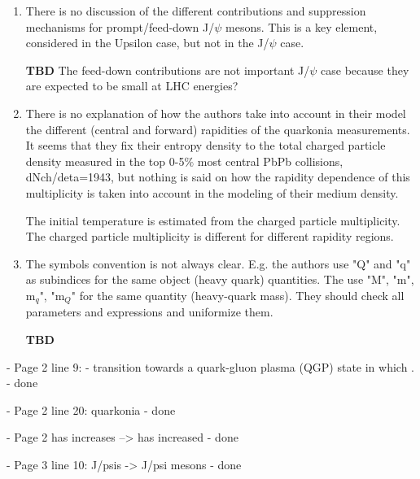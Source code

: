 \documentclass[a4paper,11pt]{article}
\begin{document}
\begin{enumerate}

\item There is no discussion of the different contributions and suppression 
mechanisms for prompt/feed-down J/$\psi$ mesons. This is a key element, considered 
in the Upsilon case, but not in the J/$\psi$ case.

{\color{red} \textbf{TBD} The feed-down contributions are not important J/$\psi$ case because they are
  expected to be small at LHC energies?} 




\item There is no explanation of how the authors take into account in their model 
the different (central and forward) rapidities of the quarkonia measurements. 
It seems that they fix their entropy density to the total charged particle density 
measured in the top 0-5$\%$ most central PbPb collisions, dNch/deta=1943, but 
nothing is said on how the rapidity dependence of this multiplicity is 
taken into account in the modeling of their medium density. 

{ \color{red} The initial temperature is estimated from the charged particle
  multiplicity. The charged particle multiplicity is different for different
  rapidity regions.
}

\item The symbols convention is not always clear. E.g. the authors use "Q" and 
"q" as subindices for the same object (heavy quark) quantities. The use "M", 
"m", m$_q$", "m$_Q$" for the same quantity (heavy-quark mass). They should check 
all parameters and expressions and uniformize them. 

{ \color{red} \textbf{TBD}
  
}
\end{enumerate}


- Page 2 line 9: - transition towards a quark-gluon plasma (QGP) state in which . \newline 
- {\color{blue} done} \newline

- Page 2 line 20: quarkonia \newline
- {\color{blue} done} \newline

- Page 2 has increases --> has increased
- {\color{blue} done} \newline

- Page 3 line 10: J/psis -> J/psi mesons \newline
- {\color{blue} done} \newline
\end{document}
